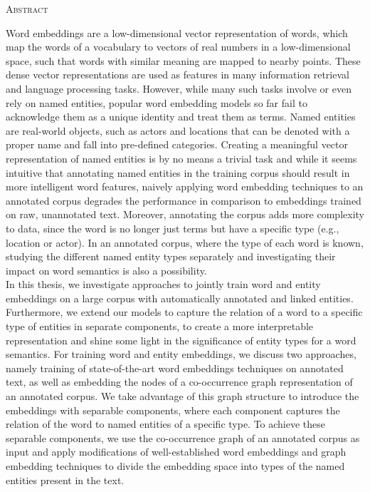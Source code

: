 \begin{center}
  \textsc{Abstract}
\end{center}
%
\noindent
%
Word embeddings are a low-dimensional vector representation of words, which map the words of a vocabulary to vectors of real numbers in a low-dimensional space, such that words with similar meaning are mapped to nearby points. These dense vector representations are used as features in many information retrieval and language processing tasks. However, while many such tasks involve or even rely on named entities, popular word embedding models so far fail to acknowledge them as a unique identity and treat them as terms. Named entities are real-world objects, such as actors and locations that can be denoted with a proper name and fall into pre-defined categories. Creating a meaningful vector representation of named entities is by no means a trivial task and while it seems intuitive that annotating named entities in the training corpus should result in more intelligent word features, naively applying word embedding techniques to an annotated corpus degrades the performance in comparison to embeddings trained on raw, unannotated text. Moreover, annotating the corpus adds more complexity to data, since the word is no longer just terms but have a specific type (e.g., location or actor). In an annotated corpus, where the type of each word is known, studying the different named entity types separately and investigating their impact on word semantics is also a possibility. \\
In this thesis, we investigate approaches to jointly train word and entity embeddings on a large corpus with automatically annotated and linked entities. Furthermore, we extend our models to capture the relation of a word to a specific type of entities in separate components, to create a more interpretable representation and shine some light in the significance of entity types for a word semantics. For training word and entity embeddings, we discuss two approaches, namely training of state-of-the-art word embeddings techniques on annotated text, as well as embedding the nodes of a co-occurrence graph representation of an annotated corpus. We take advantage of this graph structure to introduce the embeddings with separable components, where each component captures the relation of the word to named entities of a specific type. To achieve these separable components, we use the co-occurrence graph of an annotated corpus as input and apply modifications of well-established word embeddings and graph embedding techniques to divide the embedding space into types of the named entities present in the text. \\

